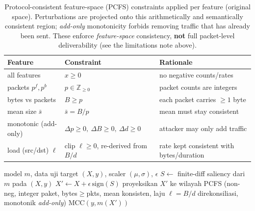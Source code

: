 \documentclass[11pt,a4paper]{article}
\begin{document}
\begin{table}[h]
\centering
\caption{Protocol-consistent feature-space (PCFS) constraints applied per feature
(original space). Perturbations are projected onto this arithmetically and
semantically consistent region; \emph{add-only} monotonicity forbids removing
traffic that has already been sent. These enforce \emph{feature-space} consistency,
\textbf{not} full packet-level deliverability (see the limitations note above).}
\label{tab:constraint}
\small
\begin{tabular}{lll}
\toprule
Feature & Constraint & Rationale \\
\midrule
all features            & $x \ge 0$                         & no negative counts/rates \\
packets $p^{f},p^{b}$   & $p \in \mathbb{Z}_{\ge 0}$        & packet counts are integers \\
bytes vs packets        & $B \ge p$                         & each packet carries $\ge 1$ byte \\
mean size $\bar{s}$     & $\bar{s} = B / p$                 & mean must stay consistent \\
monotonic (add-only)    & $\Delta p \ge 0,\ \Delta B \ge 0,\ \Delta d \ge 0$ & attacker may only add traffic \\
load (src/dst) $\ell$   & clip $\ell \ge 0$, re-derived from $B/d$ & rate kept consistent with bytes/duration \\
\bottomrule
\end{tabular}
\end{table}

\begin{algorithm}[h]
\caption{Evaluasi \emph{adaptive PCFS (protocol-consistent feature-space) evasion}}
\label{alg:adv}
\begin{algorithmic}[1]
\Require model $m$, data uji target $(X,y)$, scaler $(\mu,\sigma)$, $\epsilon$
\State $S \gets$ finite-diff saliency dari $m$ pada $(X,y)$
\State $X' \gets X + \epsilon\,\mathrm{sign}(S)$
\State proyeksikan $X'$ ke wilayah PCFS (non-neg, integer paket, bytes$\ge$pkts,
mean konsisten, laju $\ell=B/d$ direkonsiliasi, monotonik \emph{add-only})
\State \Return $\mathrm{MCC}(y, m(X'))$
\end{algorithmic}
\end{algorithm}
\end{document}
